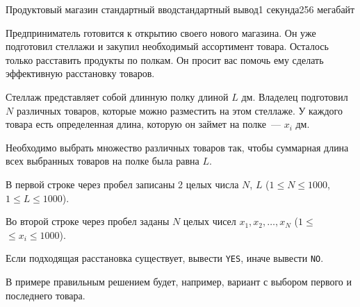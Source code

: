 \begin{problem}[(Булатов В.\,А.)]{Продуктовый магазин }{стандартный ввод}{стандартный вывод}{1 секунда}{256 мегабайт}

Предприниматель готовится к открытию своего нового магазина. Он уже подготовил стеллажи и закупил необходимый ассортимент товара. Осталось только расставить продукты по полкам. Он просит вас помочь ему сделать эффективную расстановку товаров.

Стеллаж представляет собой длинную полку длиной $L$ дм. Владелец подготовил $N$ различных товаров, которые можно разместить на этом стеллаже. У каждого товара есть определенная длина, которую он займет на полке~--- $x_i$ дм.

Необходимо выбрать множество различных товаров так, чтобы суммарная длина всех выбранных товаров на полке была равна $L$.

\InputFile
В первой строке через пробел записаны 2 целых числа $N$, $L$ ($1 \leq N \leq 1000$, $1 \leq L \leq 1000$).

Во второй строке через пробел заданы $N$ целых чисел $x_1, x_2, \ldots, x_N$ ($1 \leq $\linebreak $\leq x_i \leq 1000$).

\OutputFile
Если подходящая расстановка существует, вывести \texttt{YES}, иначе вывести \texttt{NO}.

\Example

\begin{example}
%
\end{example}

\Note
В примере правильным решением будет, например, вариант с выбором первого и последнего товара.

\end{problem}

